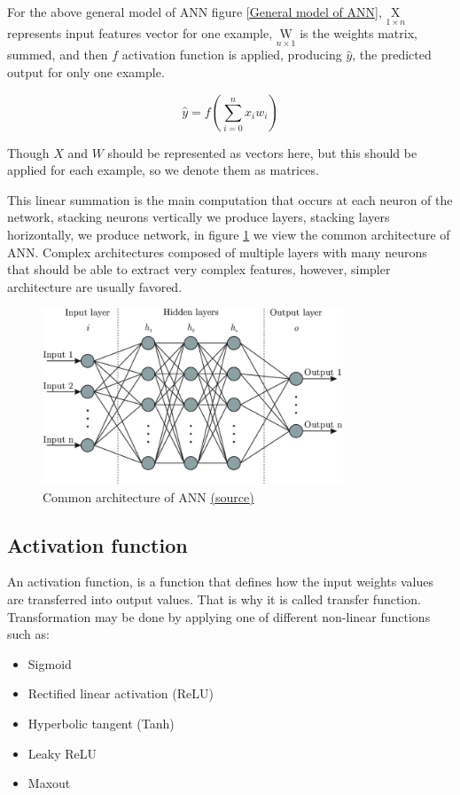 For the above general model of ANN figure \ref{General model of ANN}, $\underset{1\times n}{\mathrm{X}}$ represents input features vector for one example, $\underset{n\times 1}{\mathrm{W}}$ is the weights matrix, summed, and then $f$ activation function is applied, producing $\hat{y}$, the predicted output for only one example. 

\begin{equation} \label{eq:general model of ann}
\hat{y} = f \left( \sum_{i=0}^{n} x_i w_i \right)
\end{equation}

Though $X$ and $W$ should be represented as vectors here, but this should be applied for each example, so we denote them as matrices.

This linear summation is the main computation that occurs at each neuron of the network, stacking neurons vertically we produce layers, stacking layers horizontally, we produce network, in figure \ref{common arch of ann} we view the common architecture of ANN. Complex architectures composed of multiple layers with many neurons that should be able to extract very complex features, however, simpler architecture are usually favored.


\begin{figure}[h]
\centering
\includegraphics[width=0.8\textwidth]{images/neural_network.png}
\caption{Common architecture of ANN \href{https://www.researchgate.net/figure/Artificial-neural-network-architecture-ANN-i-h-1-h-2-h-n-o_fig1_321259051}{(\underline{source})}}
\label{common arch of ann}
\end{figure}

\subsection{Activation function}
\label{sec:activation_function}

An activation function, is a function that defines how the input weights values are transferred into output values. That is why it is called transfer function. Transformation may be done by applying one of different non-linear functions such as:
\begin{itemize}
  \item Sigmoid
  \item Rectified linear activation (ReLU)
  \item Hyperbolic tangent (Tanh)
  \item Leaky ReLU
  \item Maxout \newline
\end{itemize} 

